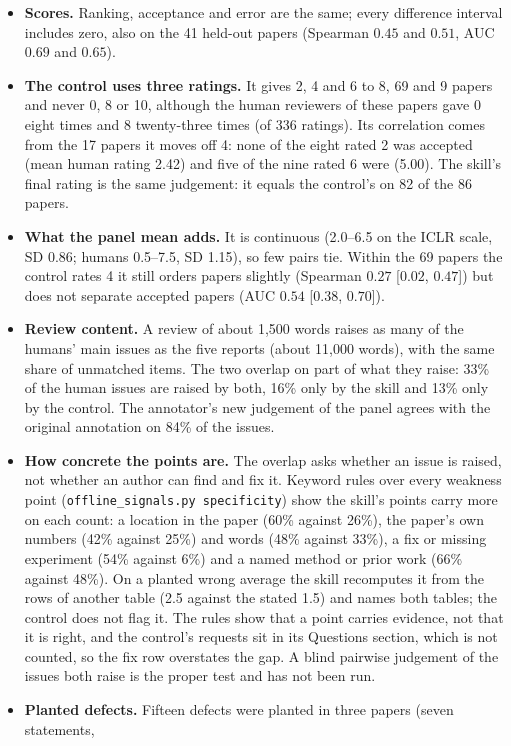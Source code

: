 \documentclass[11pt,a4paper]{article}
\begin{document}
\begin{itemize}
\item \textbf{Scores.} Ranking, acceptance and error are the same; every difference interval
includes zero, also on the 41 held-out papers (Spearman $0.45$ and $0.51$, AUC $0.69$ and $0.65$).
\item \textbf{The control uses three ratings.} It gives 2, 4 and 6 to 8, 69 and 9 papers and
never 0, 8 or 10, although the human reviewers of these papers gave 0 eight times and 8
twenty-three times (of 336 ratings). Its correlation comes from the 17 papers it moves off 4:
none of the eight rated 2 was accepted (mean human rating 2.42) and five of the nine rated 6
were (5.00). The skill's final rating is the same judgement: it equals the control's on 82 of
the 86 papers.
\item \textbf{What the panel mean adds.} It is continuous (2.0--6.5 on the ICLR scale, SD 0.86;
humans 0.5--7.5, SD 1.15), so few pairs tie. Within the 69 papers the control rates 4 it still
orders papers slightly (Spearman $0.27$ [$0.02$, $0.47$]) but does not separate accepted papers
(AUC $0.54$ [$0.38$, $0.70$]).
\item \textbf{Review content.} A review of about 1,500 words raises as many of the humans' main
issues as the five reports (about 11,000 words), with the same share of unmatched items. The two
overlap on part of what they raise: 33\% of the human issues are raised by both, 16\% only by the
skill and 13\% only by the control. The annotator's new judgement of the panel agrees with the
original annotation on 84\% of the issues.
\item \textbf{How concrete the points are.} The overlap asks whether an issue is raised, not
whether an author can find and fix it. Keyword rules over every weakness point
(\texttt{offline\_signals.py specificity}) show the skill's points carry more on each count: a
location in the paper (60\% against 26\%), the paper's own numbers (42\% against 25\%) and words
(48\% against 33\%), a fix or missing experiment (54\% against 6\%) and a named method or prior
work (66\% against 48\%). On a planted wrong average the skill recomputes it from the rows of another
table (2.5 against the stated 1.5) and names both tables; the control does not flag it. The rules
show that a point carries evidence, not that it is right, and the control's requests sit in its
Questions section, which is not counted, so the fix row overstates the gap. A blind pairwise
judgement of the issues both raise is the proper test and has not been run.
\item \textbf{Planted defects.} Fifteen defects were planted in three papers (seven statements,

\end{itemize}
\end{document}
